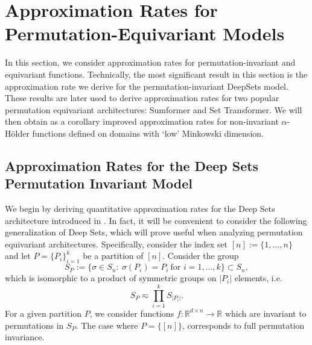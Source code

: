 \documentclass[twoside,11pt]{article}
\newcommand{\RR}{\mathbb{R}}
\newcommand{\nd}[1]{{\color{red}{\bf[Nadav:} 
#1{\bf]}}}
\newcommand{\dimM}{\overline{\mathrm{dim}}}
\begin{document}


\section{Approximation Rates for Permutation-Equivariant Models}\label{sec:permutations}

In this section, we consider approximation rates for permutation-invariant and equivariant functions. Technically, the most significant result in this section is the approximation rate we derive for the permutation-invariant DeepSets model. These results are later used to derive approximation rates for two popular permutation equivariant architectures: Sumformer and Set Transformer. We will then obtain as a corollary improved approximation rates for non-invariant $\alpha$-H\"{o}lder functions defined on domains with `low' Minkowski dimension. 

\subsection{Approximation Rates for the Deep Sets  Permutation Invariant Model}\label{subsec:DeepSets}
We begin by deriving quantitative approximation rates for the Deep Sets architecture introduced in \cite{zaheer2017deep}. In fact, it will be convenient to consider the following generalization of Deep Sets, which will prove useful when analyzing permutation equivariant architectures. Specifically, consider the index set $[n] := \{1,...,n\}$ and let $P = \{P_i\}_{i=1}^k$ be a partition of $[n]$. Consider the group
\begin{equation}
    S_P := \{\sigma\in S_n:~\sigma(P_i) = P_i~\text{for $i=1,...,k$}\} \subset S_n,
\end{equation}
which is isomorphic to a product of symmetric groups on $|P_i|$ elements, i.e.
\begin{equation}
    S_P \eqsim \prod_{i=1}^k S_{|P_i|}.
\end{equation}
For a given partition $P$, we consider functions $f:\mathbb{R}^{d\times n}\rightarrow \mathbb{R}$ which are invariant to permutations in  $S_P$. The case where  $P = \{[n]\}$,  corresponds to full permutation invariance.
\end{document}

